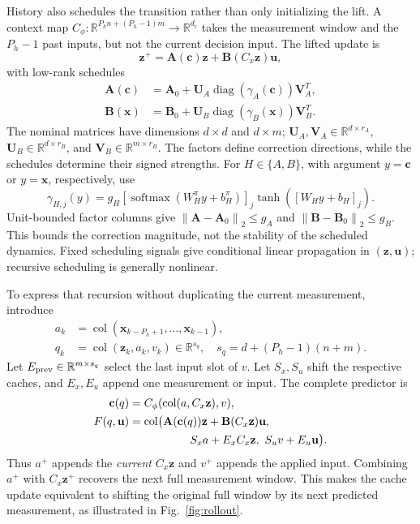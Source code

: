 \documentclass[journal]{IEEEtran}
\newcommand{\vx}{\mathbf{x}}
\newcommand{\vu}{\mathbf{u}}
\newcommand{\vz}{\mathbf{z}}
\newcommand{\vc}{\mathbf{c}}
\newcommand{\mA}{\mathbf{A}}
\newcommand{\mB}{\mathbf{B}}
\newcommand{\mU}{\mathbf{U}}
\newcommand{\mV}{\mathbf{V}}
\newcommand{\R}{\mathbb{R}}
\newcommand{\norm}[1]{\left\lVert #1\right\rVert}
\newcommand{\col}{\operatorname{col}}
\begin{document}
History also schedules the transition rather than only initializing the lift. A context map $C_\phi:\R^{P_hn+(P_h-1)m}\to\R^{d_c}$ takes the measurement window and the $P_h-1$ past inputs, but not the current decision input. The lifted update is
\begin{equation}
\vz^+=\mA(\vc)\vz+\mB(C_x\vz)\vu,
\label{eq:scheduled_predictor}
\end{equation}
with low-rank schedules
\begin{align}
\mA(\vc)&=\mA_0+\mU_A\operatorname{diag}(\gamma_A(\vc))\mV_A^T,
\label{eq:transition_schedule}\\
\mB(\vx)&=\mB_0+\mU_B\operatorname{diag}(\gamma_B(\vx))\mV_B^T.
\label{eq:low_rank_schedules}
\end{align}
The nominal matrices have dimensions $d\times d$ and $d\times m$; $\mU_A,\mV_A\in\R^{d\times r_A}$, $\mU_B\in\R^{d\times r_B}$, and $\mV_B\in\R^{m\times r_B}$. The factors define correction directions, while the schedules determine their signed strengths. For $H\in\{A,B\}$, with argument $y=\vc$ or $y=\vx$, respectively, use
\begin{equation}
\gamma_{H,j}(y)=g_H[\operatorname{softmax}(W_H^\pi y+b_H^\pi)]_j
\tanh([W_Hy+b_H]_j).
\label{eq:A_modulation_coefficients}
\end{equation}
Unit-bounded factor columns give $\norm{\mA-\mA_0}_2\le g_A$ and $\norm{\mB-\mB_0}_2\le g_B$. This bounds the correction magnitude, not the stability of the scheduled dynamics. Fixed scheduling signals give conditional linear propagation in $(\vz,\vu)$; recursive scheduling is generally nonlinear.

To express that recursion without duplicating the current measurement, introduce
\begin{equation}
\begin{split}
a_k&=\col(\vx_{k-P_h+1},\ldots,\vx_{k-1}),\\
q_k&=\col(\vz_k,a_k,v_k)\in\R^{s_q},\quad
s_q=d+(P_h-1)(n+m).
\end{split}
\label{eq:augmented_state}
\end{equation}
Let $E_{\rm prev}\in\R^{m\times s_q}$ select the last input slot of $v$. Let $S_x,S_u$ shift the respective caches, and $E_x,E_u$ append one measurement or input. The complete predictor is
\begin{equation}
\begin{split}
\vc(q)&=C_\phi(\col(a,C_x\vz),v),\\
F(q,\vu)&=\col\bigl(\mA(\vc(q))\vz+\mB(C_x\vz)\vu,\\
&\hspace{19mm}S_xa+E_xC_x\vz,\ S_uv+E_u\vu\bigr).
\end{split}
\label{eq:complete_control_model}
\end{equation}
Thus $a^+$ appends the \emph{current} $C_x\vz$ and $v^+$ appends the applied input. Combining $a^+$ with $C_x\vz^+$ recovers the next full measurement window. This makes the cache update equivalent to shifting the original full window by its next predicted measurement, as illustrated in Fig.~\ref{fig:rollout}.
\end{document}
